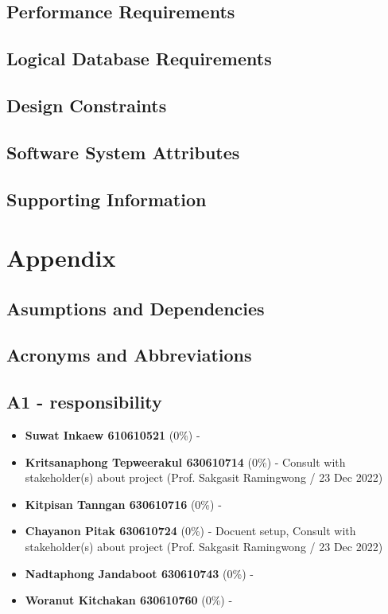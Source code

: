 \documentclass[ 10pt]{report}
\begin{document}
        \section{Performance Requirements}
        \section{Logical Database Requirements}
        \section{Design Constraints}
        \section{Software System Attributes}
        \section{Supporting Information}
    \pagebreak


    \chapter{Appendix}
        \section{Asumptions and Dependencies}
        \section{Acronyms and Abbreviations}


        \section{A1 - responsibility}
        \begin{itemize}
            \item \textbf{Suwat Inkaew 610610521} (0\%) - 
            \item \textbf{Kritsanaphong Tepweerakul 630610714} (0\%) - Consult with stakeholder(s) about project (Prof. Sakgasit Ramingwong / 23 Dec 2022)
            \item \textbf{Kitpisan Tanngan 630610716} (0\%) - 
            \item \textbf{Chayanon Pitak 630610724} (0\%) - Docuent setup, Consult with stakeholder(s) about project (Prof. Sakgasit Ramingwong / 23 Dec 2022)
            \item \textbf{Nadtaphong Jandaboot 630610743} (0\%) - 
            \item \textbf{Woranut Kitchakan 630610760} (0\%) - 
        \end{itemize}
\end{document}

